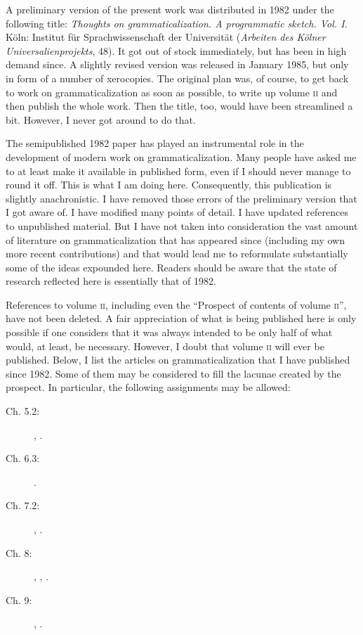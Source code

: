 \label{95preface}

A preliminary version of the present work was distributed in 1982 under the following title: \textit{Thoughts on grammaticalization. A programmatic sketch. Vol. I.} Köln: Institut für Sprachwissenschaft der Universität (\textit{Arbeiten des Kölner Universalienprojekts}, 48). It got out of stock immediately, but has been in high demand since. A slightly revised version was released in January 1985, but only in form of a number of xerocopies. The original plan was, of course, to get back to work on grammaticalization as soon as possible, to write up volume \textsc{ii} and then publish the whole work. Then the title, too, would have been streamlined a bit. However, I never got around to do that.

The semipublished 1982 paper has played an instrumental role in the development of modern work on grammaticalization. Many people have asked me to at least make it available in published form, even if I should never manage to round it off. This is what I am doing here. Consequently, this publication is slightly anachronistic. I have removed those errors of the preliminary version that I got aware of. I have modified many points of detail. I have updated references to unpublished material. But I have not taken into consideration the vast amount of literature on grammaticalization that has appeared since (including my own more recent contributions) and that would lead me to reformulate substantially some of the ideas expounded here. Readers should be aware that the state of research reflected here is essentially that of 1982.

References to volume \textsc{ii}, including even the ``Prospect of contents of volume \textsc{ii}'', have not been deleted. A fair appreciation of what is being published here is only possible if one considers that it was always intended to be only half of what would, at least, be necessary. However, I doubt that volume \textsc{ii} will ever be published. Below, I list the articles on grammaticalization that I have published since 1982. Some of them may be considered to fill the lacunae created by the prospect. In particular, the following assignments may be allowed:

\begin{description}
\item[Ch. 5.2:]  \citet{Lehmann1989a}, \citet{Lehmann2002}.

\item[Ch. 6.3:]  \citet{Lehmann1989b}.

\item[Ch. 7.2:]  \citet{Lehmann1985b}, \citet{Lehmann1986}.

\item[Ch. 8:]    \citet{Lehmann1985a}, \citet{Lehmann1987}, \citet{Lehmann1992}.

\item[Ch. 9:]    \citet{Lehmann1993}, \citet{Lehmann1995}.
\end{description}



